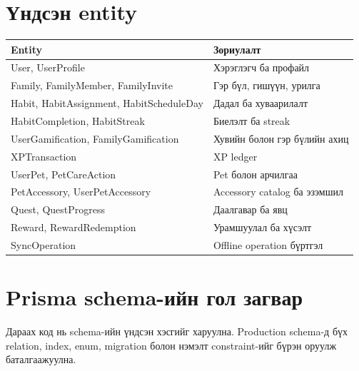 \documentclass[12pt,a4paper,oneside]{report}
\begin{document}
\section{Үндсэн entity}
\begin{longtable}{p{}p{}}
\toprule
\textbf{Entity} & \textbf{Зориулалт}\\
\midrule
User, UserProfile & Хэрэглэгч ба профайл\\
Family, FamilyMember, FamilyInvite & Гэр бүл, гишүүн, урилга\\
Habit, HabitAssignment, HabitScheduleDay & Дадал ба хуваарилалт\\
HabitCompletion, HabitStreak & Биелэлт ба streak\\
UserGamification, FamilyGamification & Хувийн болон гэр бүлийн ахиц\\
XPTransaction & XP ledger\\
UserPet, PetCareAction & Pet болон арчилгаа\\
PetAccessory, UserPetAccessory & Accessory catalog ба эзэмшил\\
Quest, QuestProgress & Даалгавар ба явц\\
Reward, RewardRedemption & Урамшуулал ба хүсэлт\\
SyncOperation & Offline operation бүртгэл\\
\bottomrule
\end{longtable}

\section{Prisma schema-ийн гол загвар}
Дараах код нь schema-ийн үндсэн хэсгийг харуулна. Production schema-д бүх relation, index, enum, migration болон нэмэлт constraint-ийг бүрэн оруулж баталгаажуулна.
\end{document}
